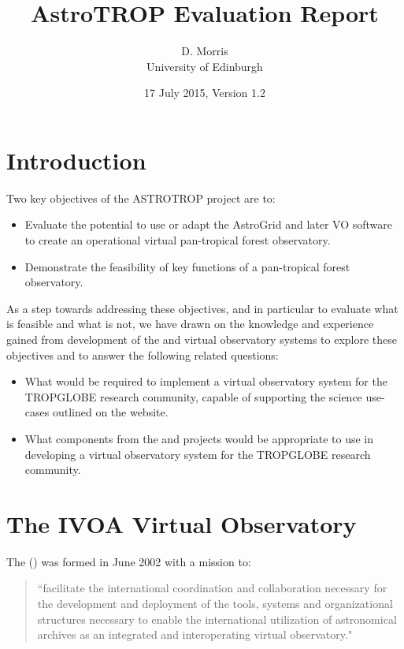 \documentclass{article}
\title{AstroTROP Evaluation Report}
\author{D. Morris \\
University of Edinburgh}
\date{17 July 2015, Version 1.2}
\begin{document}
\maketitle

\section{Introduction}

Two key objectives of the ASTROTROP project are to:
\begin{itemize}
    \item Evaluate the potential to use or adapt the AstroGrid and later VO
    software to create an operational virtual pan-tropical forest observatory.
    \item Demonstrate the feasibility of key functions of a pan-tropical
    forest observatory.
\end{itemize}

As a step towards addressing these objectives, and in particular to
evaluate what is feasible and what is not, we have drawn on the knowledge
and experience gained from development of the \cite{astro} and \cite{ivoa}
virtual observatory systems to explore these objectives and to answer the
following related questions:

\begin{itemize}
    \item What would be required to implement a virtual observatory system
    for the TROPGLOBE research community, capable of supporting the science
    use-cases outlined on the \cite{atrop} website.
    \item What components from the \cite{astro} and \cite{ivoa} projects
    would be appropriate to use in developing a virtual observatory system
    for the TROPGLOBE research community.
\end{itemize}

\section{The IVOA Virtual Observatory}

The  (\cite{ivoa}) was formed in June 2002 with a mission to:
\begin{quote}
``facilitate the international coordination and collaboration necessary for
the development and deployment of the tools, systems and organizational
structures necessary to enable the international utilization of astronomical
archives as an integrated and interoperating virtual observatory."
\end{quote}
\end{document}
